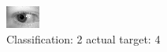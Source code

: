 \begin{figure}[h!]
\begin{center}
\includegraphics[width=0.60\columnwidth]{figures/ID813_class_2_target_4.png}
\end{center}
\caption{ Classification: 2 actual target: 4}
\label{fig:ID813_class_2_target_4}
\end{figure}
